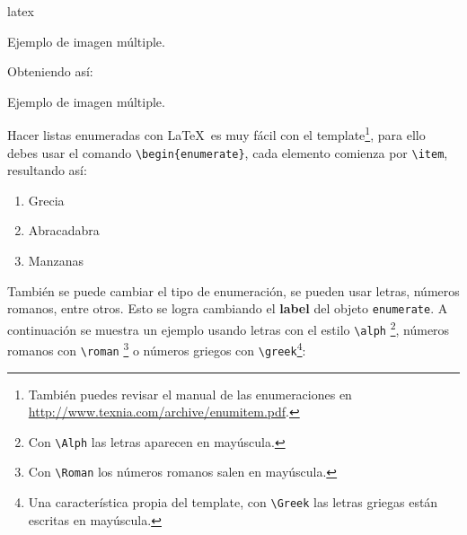 \begin{sourcecode}{latex}{}
\begin{images}[\label{imagenmultiple}]{Ejemplo de imagen múltiple.}
	\addimagenewline
\end{images}
\end{sourcecode}

	Obteniendo así:

	\begin{images}{Ejemplo de imagen múltiple.}
		\addimagenewline
	\end{images}




		Hacer listas enumeradas con \LaTeX\ es muy fácil con el template\footnote{También puedes revisar el manual de las enumeraciones en \url{http://www.texnia.com/archive/enumitem.pdf}.}, para ello debes usar el comando \texttt{\textbackslash begin\{enumerate\}}, cada elemento comienza por \texttt{\textbackslash item}, resultando así:

		\begin{enumerate}
			\item Grecia
			\item Abracadabra
			\item Manzanas
		\end{enumerate}

		También se puede cambiar el tipo de enumeración, se pueden usar letras, números romanos, entre otros. Esto se logra cambiando el \textbf{label} del objeto \texttt{enumerate}. A continuación se muestra un ejemplo usando letras con el estilo \texttt{\textbackslash alph} \footnote{Con \texttt{\textbackslash Alph} las letras aparecen en mayúscula.}, números romanos con \texttt{\textbackslash roman} \footnote{Con \texttt{\textbackslash Roman} los números romanos salen en mayúscula.} o números griegos con \texttt{\textbackslash greek}\footnote{Una característica propia del template, con \texttt{\textbackslash Greek} las letras griegas están escritas en mayúscula.}:

